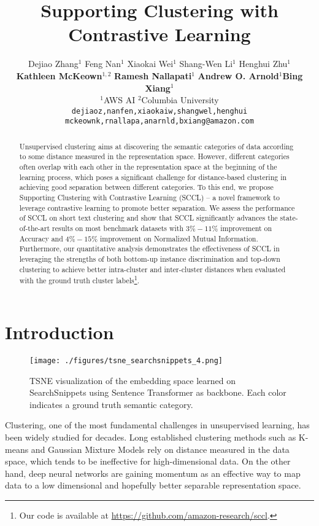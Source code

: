 \documentclass[11pt]{article}
\title{Supporting Clustering with Contrastive Learning}
\author{Dejiao Zhang$^1$ \quad Feng Nan$^1$ \quad Xiaokai Wei$^1$ \quad Shang-Wen Li$^1$  \quad  Henghui Zhu$^1$ \\ \quad   \quad \textbf{Kathleen McKeown$^{1,2}$} \quad
\textbf{Ramesh Nallapati$^1$} \quad 
\textbf{Andrew O. Arnold$^1$}\quad \textbf{Bing Xiang$^1$} \\
$^1$AWS AI \qquad  $^2$Columbia University\\
  \texttt{dejiaoz,nanfen,xiaokaiw,shangwel,henghui} \\
  \texttt{mckeownk,rnallapa,anarnld,bxiang@amazon.com}
  }
\begin{document}
\maketitle


\begin{abstract}
Unsupervised clustering aims at discovering the semantic categories of data according to some distance measured in the representation space. However, different categories often overlap with each other in the representation space at the beginning of the learning process, which poses a significant challenge for distance-based clustering in achieving good separation between different categories. To this end, we propose Supporting Clustering with Contrastive Learning (SCCL) -- a novel framework to leverage contrastive learning to promote better separation. We assess the performance of SCCL on short text clustering and show that SCCL significantly advances the state-of-the-art results on most 
benchmark datasets with $3\%-11\%$ improvement on Accuracy and $4\%-15\%$ improvement on Normalized Mutual Information. Furthermore, our quantitative analysis demonstrates the effectiveness of SCCL in leveraging the strengths of both bottom-up instance discrimination and  top-down clustering
to achieve better intra-cluster and inter-cluster distances when evaluated with the ground truth cluster labels\footnote{Our code is available at  \url{https://github.com/amazon-research/sccl}.}.
\end{abstract}


\section{Introduction}
\begin{figure}[htbp]
    \centering
    \texttt{[image: ./figures/tsne\_searchsnippets\_4.png]}
    \caption{TSNE visualization of the embedding space learned on SearchSnippets using Sentence Transformer \citep{reimers-2019-sentence-bert} as backbone. Each color indicates a ground truth semantic category.
}
    \label{fig:tsne_illustration}
\end{figure}
Clustering, one of the most fundamental challenges in unsupervised learning, has been widely studied for decades. 
Long established clustering methods
such as K-means \citep{macqueen1967some, lloyd1982least} and Gaussian Mixture Models \citep{celeux1995gaussian} rely on distance measured in the data space, which tends to be ineffective for high-dimensional data. 
On the other hand, deep neural networks are gaining momentum as an effective way to map data to a low dimensional and hopefully better separable representation space.
\end{document}
